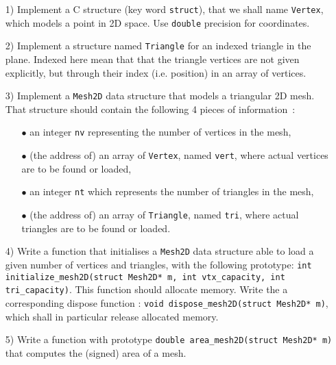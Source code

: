 \documentclass[a4paper,12pt]{article}
\begin{document}
\begin{itemize}

\item[1)] Implement a C structure (key word \texttt{struct}),
  that we shall name \texttt{Vertex}, which models a point in 2D space. Use {\tt double} precision 
  for coordinates.\\[-5pt]

\item[2)] Implement a structure named \texttt{Triangle} for an indexed triangle in the plane. Indexed here mean that   that the triangle vertices are not given explicitly, but through their index (i.e. position) in an array of vertices.\\[-5pt]

\item[3)] Implement a \texttt{Mesh2D} data structure that models a triangular 2D mesh. That structure should contain the following 4 pieces of information~:
  \begin{itemize}
  \item[$\bullet$] an integer \texttt{nv} representing the number of vertices in the mesh,
  \item[$\bullet$] (the address of) an array of {\tt Vertex}, named \texttt{vert}, where actual vertices are to be found or loaded,
  \item[$\bullet$] an integer \texttt{nt} which represents the number of triangles in the mesh,
  \item[$\bullet$] (the address of) an array of \texttt{Triangle}, named \texttt{tri}, where actual triangles are to be found or loaded.\\[-5pt]
  \end{itemize}

\item[4)] Write a function that initialises a {\tt Mesh2D} data structure able to load a given number of vertices and triangles, with the following prototype: \texttt{int initialize\_mesh2D(struct Mesh2D* m, int vtx\_capacity, int tri\_capacity)}. This function should allocate memory. Write the a corresponding dispose function : \texttt{void dispose\_mesh2D(struct Mesh2D* m)}, which shall in particular release allocated memory.\\[-5pt]

\item[5)] Write a function with prototype \texttt{double area\_mesh2D(struct Mesh2D* m)} that computes the (signed) area of a mesh.


\end{itemize}
\end{document}
